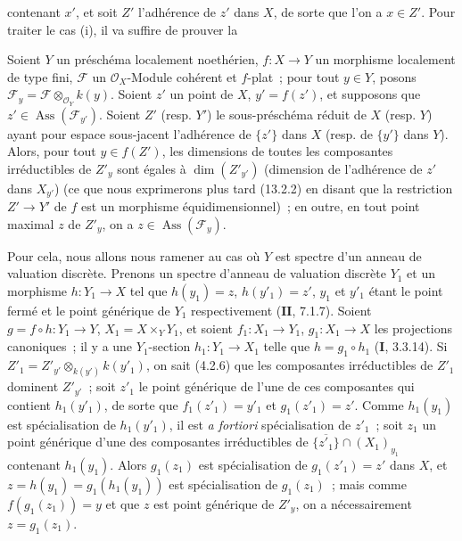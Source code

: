 contenant $x'$, et soit $Z'$ l'adhérence de $z'$ dans $X$, de sorte que l'on a
$x\in Z'$. Pour traiter le cas (i), il va suffire de prouver la

\begin{proposition}[12.1.1.5]
\label{IV.12.1.1.5-fr}
Soient $Y$ un préschéma localement noethérien, $f:X\to Y$ un morphisme
localement de type fini, $\mathcal F$ un $\mathcal O_X$-Module cohérent et
$f$-plat~; pour tout $y\in Y$, posons
$\mathcal F_y=\mathcal F\otimes_{\mathcal O_Y}k(y)$. Soient $z'$ un point de
$X$, $y'=f(z')$, et supposons que $z'\in\operatorname{Ass}(\mathcal F_{y'})$.
Soient $Z'$ (resp. $Y'$) le sous-préschéma réduit de $X$ (resp. $Y$) ayant
pour espace sous-jacent l'adhérence de $\{z'\}$ dans $X$ (resp. de $\{y'\}$
dans $Y$). Alors, pour tout $y\in f(Z')$, les dimensions de toutes les
composantes irréductibles de $Z'_y$ sont égales à $\dim(Z'_{y'})$ (dimension
de l'adhérence de $z'$ dans $X_{y'}$) (ce que nous exprimerons plus tard
(13.2.2) en disant que la restriction $Z'\to Y'$ de $f$ est un morphisme
équidimensionnel)~; en outre, en tout point maximal $z$ de $Z'_y$, on a
$z\in\operatorname{Ass}(\mathcal F_y)$.
\end{proposition}

Pour cela, nous allons nous ramener au cas où $Y$ est spectre d'un anneau de
valuation discrète. Prenons un spectre d'anneau de valuation discrète $Y_1$ et
un morphisme $h:Y_1\to X$ tel que $h(y_1)=z$, $h(y'_1)=z'$, $y_1$ et $y'_1$
étant le point fermé et le point générique de $Y_1$ respectivement
($\mathbf{II}$, 7.1.7). Soient $g=f\circ h:Y_1\to Y$,
$X_1=X\times_YY_1$, et soient $f_1:X_1\to Y_1$, $g_1:X_1\to X$ les projections
canoniques~; il y a une $Y_1$-section $h_1:Y_1\to X_1$ telle que
$h=g_1\circ h_1$ ($\mathbf I$, 3.3.14). Si
$Z'_1=Z'_{y'}\otimes_{k(y')}k(y'_1)$, on sait (4.2.6) que les composantes
irréductibles de $Z'_1$ dominent $Z'_{y'}$~; soit $z'_1$ le point générique de
l'une de ces composantes qui contient $h_1(y'_1)$, de sorte que
$f_1(z'_1)=y'_1$ et $g_1(z'_1)=z'$. Comme $h_1(y_1)$ est spécialisation de
$h_1(y'_1)$, il est \emph{a fortiori} spécialisation de $z'_1$~; soit $z_1$ un
point générique d'une des composantes irréductibles de
$\overline{\{z'_1\}}\cap(X_1)_{y_1}$ contenant $h_1(y_1)$. Alors $g_1(z_1)$
est spécialisation de $g_1(z'_1)=z'$ dans $X$, et
$z=h(y_1)=g_1(h_1(y_1))$ est spécialisation de $g_1(z_1)$~; mais comme
$f(g_1(z_1))=y$ et que $z$ est point générique de $Z'_y$, on a nécessairement
$z=g_1(z_1)$.

